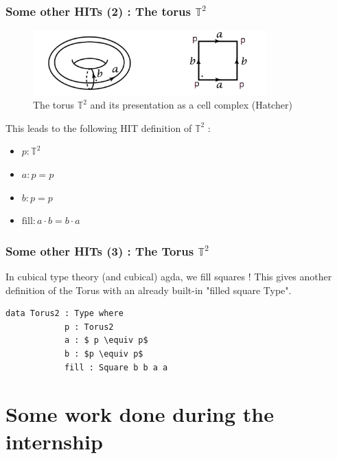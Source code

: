 \documentclass{beamer}
\begin{document}
    \begin{frame}[fragile]
        \frametitle{Some other HITs (2) : The torus $\mathbb{T}^2$}
        \begin{figure}[h]
            \begin{center}
              \includegraphics[height= 2.5cm]{torus.png}
              \caption{The torus $\mathbb{T}^2$ and its presentation as a cell complex (Hatcher)}
            \end{center}
          \end{figure}
        \pause
        This leads to the following HIT definition of $\mathbb{T}^2$ :
        \begin{itemize}
            \item $ p : \mathbb{T}^2$
            \item $a : p = p$
            \item $b : p = p $
            \item $\mathrm{fill} :  a \cdot b = b \cdot a$
        \end{itemize}
    \end{frame}
    \begin{frame}[fragile]
        \frametitle{Some other HITs (3) : The Torus $\mathbb{T}^2$}
        In cubical type theory (and cubical) agda, we fill squares !
        \pause
        This gives another definition of the Torus with an already built-in "filled square Type".\\
        \begin{lstlisting}[mathescape=true]
            data Torus2 : Type where
            p : Torus2
            a : $ p \equiv p$
            b : $p \equiv p$
            fill : Square b b a a
        \end{lstlisting}
    \end{frame}
    \section{Some work done during the internship}
\end{document}
